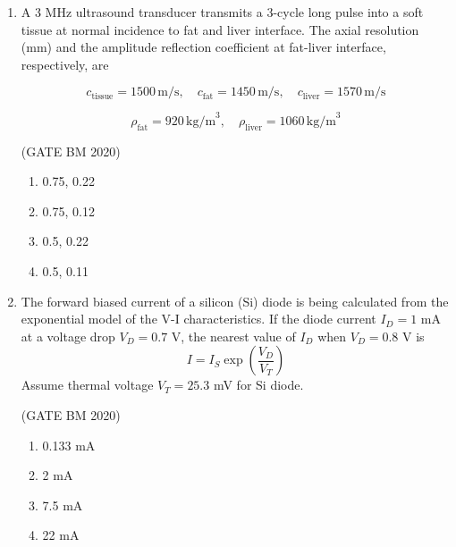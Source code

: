 \documentclass[journal]{IEEEtran}
\begin{document}
\begin{enumerate}
\hfill(GATE BM 2020)
\begin{multicols}{4}
\begin{enumerate}
  \item 1.5
  \item 3.0
  \item 4.5
  \item 6.0
\end{enumerate}
\end{multicols}


\item A 3 MHz ultrasound transducer transmits a 3-cycle long pulse into a soft tissue at normal incidence to fat and liver interface. The axial resolution (mm) and the amplitude reflection coefficient at fat-liver interface, respectively, are

\[
c_{\text{tissue}} = 1500 \,\text{m/s}, \quad c_{\text{fat}} = 1450 \,\text{m/s}, \quad c_{\text{liver}} = 1570 \,\text{m/s}
\]

\[
\rho_{\text{fat}} = 920 \,\text{kg/m}^3, \quad \rho_{\text{liver}} = 1060 \,\text{kg/m}^3
\]


\hfill(GATE BM 2020)
\begin{multicols}{2}
\begin{enumerate}
  \item 0.75, 0.22
  \item 0.75, 0.12
  \item 0.5, 0.22
  \item 0.5, 0.11
\end{enumerate}
\end{multicols}


\item The forward biased current of a silicon (Si) diode is being calculated from the exponential model of the V-I characteristics. If the diode current $I_D = 1$ mA at a voltage drop $V_D = 0.7$ V, the nearest value of $I_D$ when $V_D = 0.8$ V is
\[
I = I_S \exp\left(\frac{V_D}{V_T}\right)
\]
Assume thermal voltage $V_T = 25.3$ mV for Si diode.


\hfill(GATE BM 2020)
\begin{multicols}{2}
\begin{enumerate}
  \item 0.133 mA
  \item 2 mA
  \item 7.5 mA
  \item 22 mA
\end{enumerate}
\end{multicols}



\end{enumerate}
\end{document}
